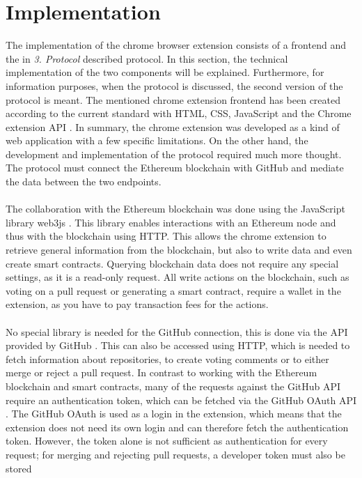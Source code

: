 \documentclass[sigconf]{acmart}
\begin{document}
\section{Implementation}
The implementation of the chrome browser extension consists of a frontend and the in \textit{3. Protocol} described protocol.
In this section, the technical implementation of the two components will be explained. Furthermore, for information purposes, 
when the protocol is discussed, the second version of the protocol is meant.
The mentioned chrome extension frontend has been created according to the current standard with HTML, CSS, JavaScript 
and the Chrome extension API \cite{chrome2021api}. In summary, the chrome extension was developed as a kind of web application 
with a few specific limitations. On the other hand, the development and implementation of the protocol required much more thought.
The protocol must connect the Ethereum blockchain with GitHub and mediate the data between the two endpoints. \\ \\
The collaboration with the Ethereum blockchain was done using the JavaScript library web3js \cite{web32021js}. 
This library enables interactions with an 
Ethereum node and thus with the blockchain using HTTP. This allows the chrome extension to retrieve general information from the 
blockchain, but also to write data and even create smart contracts. Querying blockchain data does not require any special settings, 
as it is a read-only request. All write actions on the blockchain, such as voting on a pull request or generating a smart contract, require
 a wallet in the extension, as you have to pay transaction fees for the actions. \\ \\
No special library is needed for the GitHub connection, this is done via the API provided by GitHub \cite{git2021api}. 
This can also be accessed using 
HTTP, which is needed to fetch information about repositories, to create voting comments or to either merge or reject a pull request.
In contrast to working with the Ethereum blockchain and smart contracts, many of the requests against the GitHub API require an 
authentication token, which can be fetched via the GitHub OAuth API \cite{git2021auth}. The GitHub OAuth is used as a login in the extension, which
 means that the extension does not need its own login and can therefore fetch the authentication token. However, the token alone 
is not sufficient as authentication for every request; for merging and rejecting pull requests, a developer token must also be stored 
\end{document}
